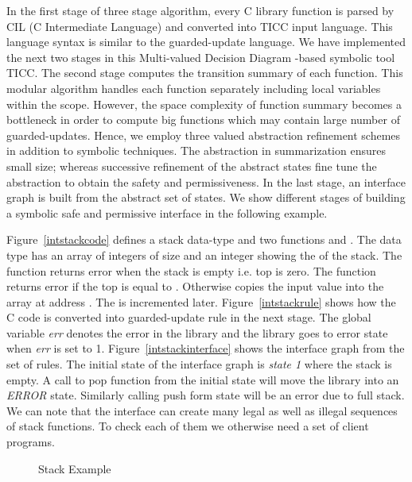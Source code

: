 \documentclass{llncs}
\begin{document}
In the first stage of three stage algorithm, every C library function is parsed by CIL (C Intermediate Language)\cite{CIL} and converted into TICC \cite{TICC-tool} input language.
This language syntax is similar to the guarded-update language.
We have implemented the next two stages in this Multi-valued Decision Diagram \cite{MDD90}-based symbolic tool TICC.  
The second stage computes the transition summary of each function. 
This modular algorithm handles each function separately including local variables within the scope.
However,  the space complexity of function summary becomes a bottleneck in order to compute big functions which may contain large number of guarded-updates. 
Hence, we employ  three valued abstraction refinement schemes in addition to symbolic techniques.
The abstraction in summarization ensures small size; whereas successive refinement of the 
abstract states fine tune the abstraction to obtain the safety and permissiveness.
In the last stage, an interface graph is built from the abstract set of states. We show different
stages of building a symbolic safe and permissive interface in the following example. 
\begin{example}
Figure~\ref{intstackcode} defines a stack data-type  and two functions  and .
The data type  has an array of integers  of size  and an integer showing the 
of the stack. 
The function  returns error when the stack is empty i.e. top is zero. The function 
returns error if the top is equal to . 
Otherwise copies the input value  into the  array at address . 
The  is incremented later.
Figure~\ref{intstackrule} shows how the C code is converted into guarded-update rule in the next stage.
The global variable {\em err} denotes the error in the library and the library goes to error state
when {\em err} is set to 1.
Figure~\ref{intstackinterface} shows the interface graph from the set of rules.
The initial state of the interface graph is {\em state 1} where the stack is empty.
A call to pop function from the initial state will move the library into an {\em ERROR} state.
Similarly calling push form state  will be an error due to full stack. 
We can note that the interface can create many legal as well as illegal sequences of stack functions. 
To check each of them we otherwise need a set of client programs.
\begin{figure}[htb]
\centering
{}
\caption{Stack Example}\label{intstack}
\end{figure}
\end{example}
\end{document}
